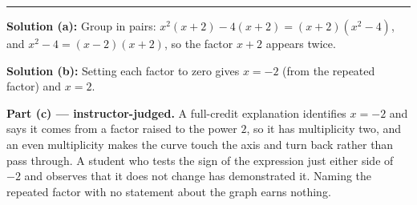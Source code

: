 \documentclass[12pt]{article}
\begin{document}
\vspace{0.15cm}
\noindent\rule{\linewidth}{0.2pt}


\textbf{Solution (a):} Group in pairs: $x^{2}(x + 2) - 4(x + 2) = (x + 2)(x^{2} - 4)$,
and $x^{2} - 4 = (x - 2)(x + 2)$, so the factor $x + 2$ appears twice.

\textbf{Solution (b):} Setting each factor to zero gives $x = -2$ (from the
repeated factor) and $x = 2$. 

\textbf{Part (c) --- instructor-judged.} A full-credit explanation identifies
$x = -2$ and says it comes from a factor raised to the power $2$, so it has
multiplicity two, and an even multiplicity makes the curve touch the axis and
turn back rather than pass through. A student who tests the sign of the
expression just either side of $-2$ and observes that it does not change has
demonstrated it. Naming the repeated factor with no statement about the graph
earns nothing.
\end{document}
